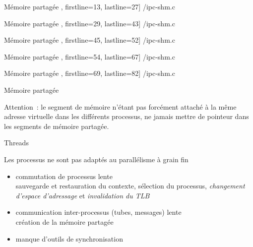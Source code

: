 \begin {frame} [fragile] {Mémoire partagée}
    \scriptsize\lstmonstyle, firstline=13, lastline=27] {\inc/ipc-shm.c}
\end{frame}

\begin {frame} [fragile] {Mémoire partagée}
    \scriptsize\lstmonstyle, firstline=29, lastline=43] {\inc/ipc-shm.c}
\end{frame}

\begin {frame} [fragile] {Mémoire partagée}
    \scriptsize\lstmonstyle, firstline=45, lastline=52] {\inc/ipc-shm.c}
\end{frame}

\begin {frame} [fragile] {Mémoire partagée}
    \scriptsize\lstmonstyle, firstline=54, lastline=67] {\inc/ipc-shm.c}
\end{frame}

\begin {frame} [fragile] {Mémoire partagée}
    \scriptsize\lstmonstyle, firstline=69, lastline=82] {\inc/ipc-shm.c}
\end{frame}

\begin {frame} {Mémoire partagée}

    Attention~: le segment de mémoire n'étant pas forcément attaché
    à la même adresse virtuelle dans les différents processus, ne
    jamais mettre de pointeur dans les segments de mémoire partagée.

\end {frame}



\begin {frame} {Threads}

    Les processus ne sont pas adaptés au parallélisme à grain fin

    \begin {itemize}
	\item commutation de processus lente \\
	    \implique sauvegarde et restauration du contexte,
		sélection du processus, \emph {changement d'espace
		d'adressage} et \emph {invalidation du TLB}

	\item communication inter-processus (tubes, messages) lente \\
	    \implique création de la mémoire partagée

	\item manque d'outils de synchronisation

    \end {itemize}
\end {frame}

